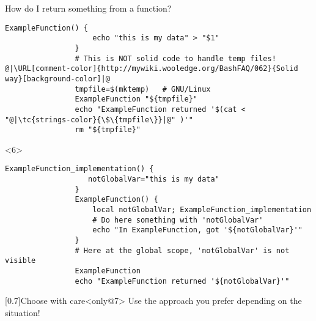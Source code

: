\begin{frame}[fragile]{How do I return something from a function?}
\begin{overlayarea}{\textwidth}{0.7\textheight}
\begin{onlyenv}
            \begin{lstlisting}[style=MyBash, numbers=none]
                ExampleFunction() {
                    echo "this is my data" > "$1"
                }
                # This is NOT solid code to handle temp files! @|\URL[comment-color]{http://mywiki.wooledge.org/BashFAQ/062}{Solid way}[background-color]|@
                tmpfile=$(mktemp)   # GNU/Linux
                ExampleFunction "${tmpfile}"
                echo "ExampleFunction returned '$(cat < "@|\tc{strings-color}{\$\{tmpfile\}}|@" )'"
                rm "${tmpfile}"
            \end{lstlisting}
        \end{onlyenv}
        \begin{onlyenv}<6>
            \begin{lstlisting}[style=MyBash, numbers=none, emph={[7]notGlobalVar},]
                ExampleFunction_implementation() {
                   notGlobalVar="this is my data"
                }
                ExampleFunction() {
                    local notGlobalVar; ExampleFunction_implementation
                    # Do here something with 'notGlobalVar'
                    echo "In ExampleFunction, got '${notGlobalVar}'"
                }
                # Here at the global scope, 'notGlobalVar' is not visible
                ExampleFunction
                echo "ExampleFunction returned '${notGlobalVar}'"
            \end{lstlisting}
        \end{onlyenv}
        \vspace{-3mm}
        \begin{varblock}{}[0.7\textwidth]{Choose with care}<only@7>
            Use the approach you prefer depending on the situation!
        \end{varblock}
    \end{overlayarea}
\end{frame}
